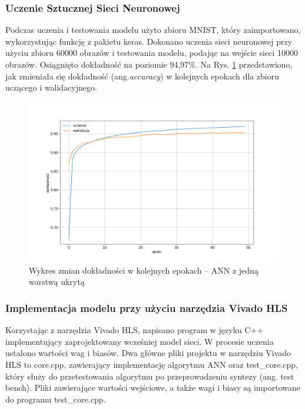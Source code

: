 \subsubsection{Uczenie Sztucznej Sieci Neuronowej}
Podczas uczenia i testowania modelu użyto zbioru MNIST, który zaimportowano, wykorzystując
funkcję z pakietu keras. Dokonano uczenia sieci neuronowej przy użyciu zbioru 60000 
obrazów i testowania modelu, podając na wejście sieci 10000 obrazów. Osiągnięto 
dokładność na poziomie 94,97\%. Na Rys. \ref{keras-accuracy1} przedstawiono, jak zmieniała się dokładność (ang.\emph{accuracy}) w kolejnych epokach dla zbioru uczącego i walidacyjnego.

\begin{figure}[!h]
  \centering
  \includegraphics[width=\textwidth]{img/keras-accuracy1.png}
  \caption{Wykres zmian dokładności w kolejnych epokach -- ANN z jedną warstwą ukrytą}
  \label{keras-accuracy1}
\end{figure}


\subsubsection{Implementacja modelu przy użyciu narzędzia Vivado HLS}

Korzystając z narzędzia Vivado HLS, napisano program w języku C++ implementujący 
zaprojektowany wcześniej model sieci. W procesie uczenia ustalono wartości wag i 
biasów. Dwa główne pliki projektu w narzędziu Vivado HLS to core.cpp, zawierający 
implementację algorytmu ANN oraz test\_core.cpp, który służy do przetestowania
algorytmu po przeprowadzeniu syntezy (ang. test bench).   
Pliki zawierające wartości wejściowe, a także wagi i biasy są importowane 
do programu test\_core.cpp. 

